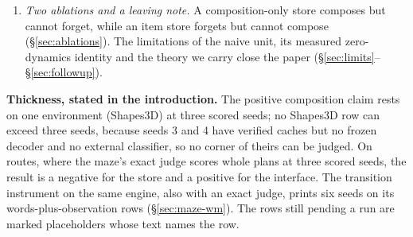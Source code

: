 \documentclass{article} %
\begin{document}
\begin{enumerate}[leftmargin=*,itemsep=2pt]
  +0.046). A colour-relational request coding lifts the store on every seed, but rivals handed the %
  same columns close most of that gap, so it is an input-representation result, not a store result
  (\S\ref{sec:maze-wm}). We offer the transition instrument itself as a minor contribution.
\item \emph{Two ablations and a leaving note.} A composition-only store composes but cannot
  forget, while an item store forgets but cannot compose (\S\ref{sec:ablations}). The
  limitations of the naive unit, its measured zero-dynamics identity and the theory we carry
  close the paper (\S\ref{sec:limits}--\S\ref{sec:followup}).
\end{enumerate}

\noindent\textbf{Thickness, stated in the introduction.} The positive composition claim rests
on one environment (Shapes3D) at three scored seeds; no Shapes3D row can exceed three seeds,
because seeds 3 and 4 have verified caches but no frozen decoder and no external classifier, so no
corner of theirs can be judged. %
On routes, where the maze's exact judge scores whole plans at three scored seeds, the result is
a negative for the store and a positive for the interface. The transition instrument on the same
engine, also with an exact judge, prints six seeds on its words-plus-observation rows
(\S\ref{sec:maze-wm}). The rows still pending a run are marked placeholders whose text names the row.

\end{document}
